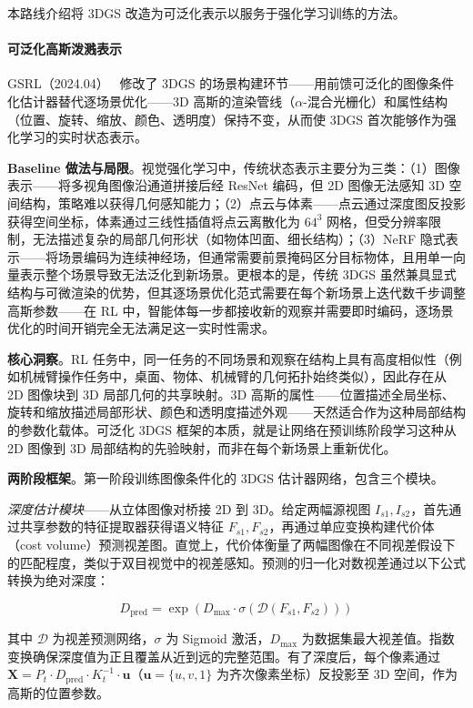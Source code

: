 本路线介绍将 3DGS 改造为可泛化表示以服务于强化学习训练的方法。

\paragraph{可泛化高斯泼溅表示}

GSRL（2024.04）~\cite{2404_07950} 修改了 3DGS 的场景构建环节——用前馈可泛化的图像条件化估计器替代逐场景优化——3D 高斯的渲染管线（$\alpha$-混合光栅化）和属性结构（位置、旋转、缩放、颜色、透明度）保持不变，从而使 3DGS 首次能够作为强化学习的实时状态表示。

\textbf{Baseline 做法与局限}。视觉强化学习中，传统状态表示主要分为三类：（1）图像表示——将多视角图像沿通道拼接后经 ResNet 编码，但 2D 图像无法感知 3D 空间结构，策略难以获得几何感知能力；（2）点云与体素——点云通过深度图反投影获得空间坐标，体素通过三线性插值将点云离散化为 $64^3$ 网格，但受分辨率限制，无法描述复杂的局部几何形状（如物体凹面、细长结构）；（3）NeRF 隐式表示——将场景编码为连续神经场，但通常需要前景掩码区分目标物体，且用单一向量表示整个场景导致无法泛化到新场景。更根本的是，传统 3DGS 虽然兼具显式结构与可微渲染的优势，但其逐场景优化范式需要在每个新场景上迭代数千步调整高斯参数——在 RL 中，智能体每一步都接收新的观察并需要即时编码，逐场景优化的时间开销完全无法满足这一实时性需求。

\textbf{核心洞察}。RL 任务中，同一任务的不同场景和观察在结构上具有高度相似性（例如机械臂操作任务中，桌面、物体、机械臂的几何拓扑始终类似），因此存在从 2D 图像块到 3D 局部几何的共享映射。3D 高斯的属性——位置描述全局坐标、旋转和缩放描述局部形状、颜色和透明度描述外观——天然适合作为这种局部结构的参数化载体。可泛化 3DGS 框架的本质，就是让网络在预训练阶段学习这种从 2D 图像到 3D 局部结构的先验映射，而非在每个新场景上重新优化。

\textbf{两阶段框架}。第一阶段训练图像条件化的 3DGS 估计器网络，包含三个模块。

\textit{深度估计模块}——从立体图像对桥接 2D 到 3D。给定两幅源视图 $I_{s1}, I_{s2}$，首先通过共享参数的特征提取器获得语义特征 $F_{s1}, F_{s2}$，再通过单应变换构建代价体（cost volume）预测视差图。直觉上，代价体衡量了两幅图像在不同视差假设下的匹配程度，类似于双目视觉中的视差感知。预测的归一化对数视差通过以下公式转换为绝对深度：

\begin{equation}
    D_\text{pred} = \exp(D_\text{max} \cdot \sigma(\mathcal{D}(F_{s1}, F_{s2})))
\end{equation}

其中 $\mathcal{D}$ 为视差预测网络，$\sigma$ 为 Sigmoid 激活，$D_\text{max}$ 为数据集最大视差值。指数变换确保深度值为正且覆盖从近到远的完整范围。有了深度后，每个像素通过 $\mathbf{X} = P_t \cdot D_\text{pred} \cdot K_t^{-1} \cdot \mathbf{u}$（$\mathbf{u}=\{u,v,1\}$ 为齐次像素坐标）反投影至 3D 空间，作为高斯的位置参数。

